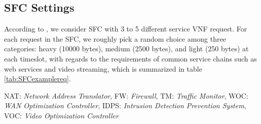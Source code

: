 


\subsection{SFC Settings}
According to \cite{SFCrequestsetting}, we consider SFC with 3 to 5 different service VNF request. For each request in the SFC, we roughly pick a random choice among three categories: heavy (10000 bytes), medium (2500 bytes), and light (250 bytes) at each timeslot, with regards to the requirements of common service chains such as web services and video streaming, which is summarized in table \ref{tab:SFCexamplereq}.
\begin{table}[htbp]
	\caption{Requirements for common SFCs}
		\vspace{\baselineskip}
	\centering
	\setcellgapes{5pt}\makegapedcells
		\vspace{\baselineskip}
	{\raggedright  \newline
		NAT: \textit{Network Address Translator}, FW: \textit{Firewall}, TM: \textit{Traffic Monitor}, WOC: \textit{WAN Optimization Controller}, IDPS: \textit{Intrusion Detection Prevention System}, VOC: \textit{Video Optimization Controller}  \par}
	\label{tab:SFCexamplereq}
\end{table}

